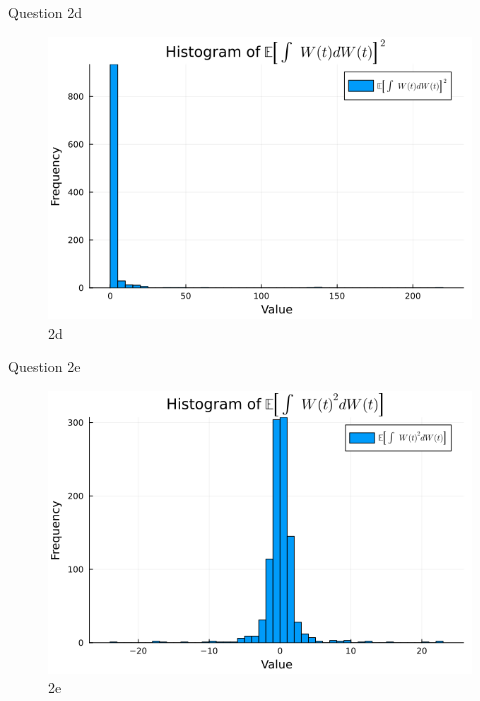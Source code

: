 \documentclass[compress,12pt]{beamer}
\begin{document}
\begin{frame}{Question 2d}
      \begin{figure}[H]
            \centering
            \includegraphics[scale=0.5]{imgs/2d.png}
            \caption{2d}
            \label{fig:2d}
      \end{figure}
\end{frame}

\begin{frame}{Question 2e}
      \begin{figure}[H]
            \centering
            \includegraphics[scale=0.5]{imgs/2e.png}
            \caption{2e}
            \label{fig:2e}
      \end{figure}

\end{frame}
\end{document}
